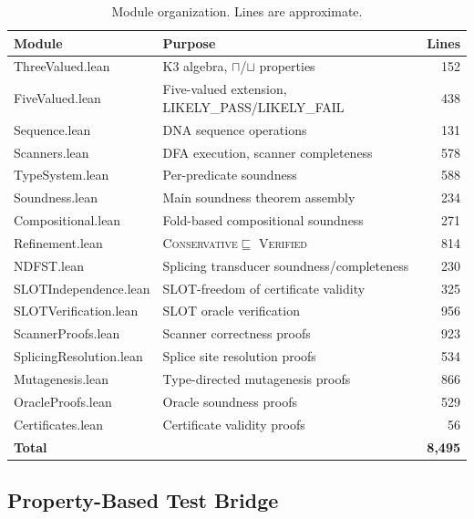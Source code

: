 \documentclass[acmsmall,review,anonymous]{acmart}
\newcommand{\tand}{\sqcap}
\newcommand{\CONSERVATIVE}{\textsc{Conservative}\xspace}
\newcommand{\VERIFIED}{\textsc{Verified}\xspace}
\begin{document}
\begin{table}[t]
\centering
\caption{Module organization. Lines are approximate.}
\label{tab:modules}
\begin{tabular}{llr}
\toprule
\textbf{Module} & \textbf{Purpose} & \textbf{Lines} \\
\midrule
ThreeValued.lean       & K3 algebra, $\tand$/$\sqcup$ properties & 152 \\
FiveValued.lean        & Five-valued extension, LIKELY\_PASS/LIKELY\_FAIL & 438 \\
Sequence.lean          & DNA sequence operations                  & 131 \\
Scanners.lean          & DFA execution, scanner completeness       & 578 \\
TypeSystem.lean        & Per-predicate soundness                  & 588 \\
Soundness.lean         & Main soundness theorem assembly          & 234 \\
Compositional.lean     & Fold-based compositional soundness       & 271 \\
Refinement.lean        & \CONSERVATIVE $\sqsubseteq$ \VERIFIED   & 814 \\
NDFST.lean             & Splicing transducer soundness/completeness & 230 \\
SLOTIndependence.lean  & SLOT-freedom of certificate validity     & 325 \\
SLOTVerification.lean  & SLOT oracle verification                 & 956 \\
ScannerProofs.lean     & Scanner correctness proofs               & 923 \\
SplicingResolution.lean & Splice site resolution proofs           & 534 \\
Mutagenesis.lean       & Type-directed mutagenesis proofs         & 866 \\
OracleProofs.lean      & Oracle soundness proofs                  & 529 \\
Certificates.lean      & Certificate validity proofs              & 56 \\
\midrule
\textbf{Total}         & & \textbf{8{,}495} \\
\bottomrule
\end{tabular}
\end{table}

\subsection{Property-Based Test Bridge}\label{sec:pbt}
\end{document}
